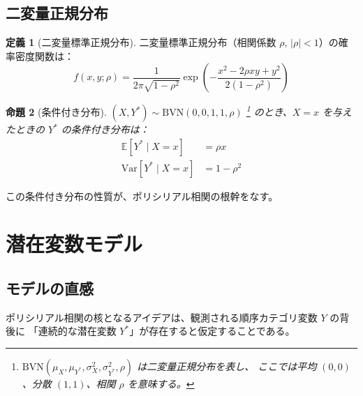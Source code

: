 \documentclass[a4paper,11pt]{ltjsarticle}
\theoremstyle{definition}
\newtheorem{definition}{定義}[section]
\theoremstyle{plain}
\newtheorem{proposition}[definition]{命題}
\theoremstyle{remark}
\newcommand{\Var}{\mathrm{Var}}
\newcommand{\E}{\mathbb{E}}
\begin{document}
\subsection{二変量正規分布}

\begin{definition}[二変量標準正規分布]
二変量標準正規分布（相関係数 $\rho$, $|\rho| < 1$）の確率密度関数は：
\[
    f(x, y; \rho) = \frac{1}{2\pi\sqrt{1-\rho^2}} 
    \exp\left(-\frac{x^2 - 2\rho xy + y^2}{2(1-\rho^2)}\right)
\]
\end{definition}

\begin{proposition}[条件付き分布]
$(X, Y^*) \sim \text{BVN}(0, 0, 1, 1, \rho)$%
\footnote{$\text{BVN}(\mu_X, \mu_{Y^*}, \sigma_X^2, \sigma_{Y^*}^2, \rho)$ は二変量正規分布を表し、
ここでは平均 $(0, 0)$、分散 $(1, 1)$、相関 $\rho$ を意味する。}
のとき、$X = x$ を与えたときの $Y^*$ の条件付き分布は：
\begin{align}
    \E[Y^* \mid X = x] &= \rho x \\
    \Var[Y^* \mid X = x] &= 1 - \rho^2
\end{align}
\end{proposition}

この条件付き分布の性質が、ポリシリアル相関の根幹をなす。

\section{潜在変数モデル}

\subsection{モデルの直感}

ポリシリアル相関の核となるアイデアは、観測される順序カテゴリ変数 $Y$ の背後に
「連続的な潜在変数 $Y^*$」が存在すると仮定することである。
\end{document}
